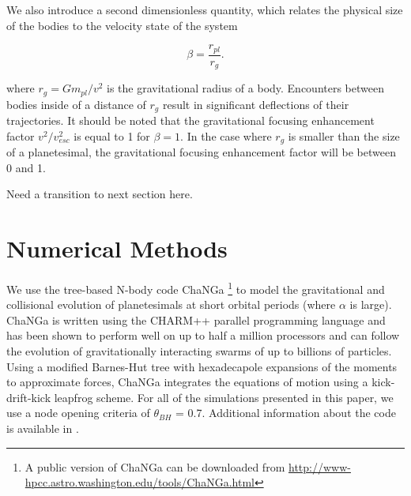 \documentclass[twocolumn]{aastex63}
\begin{document}
We also introduce a second dimensionless quantity, which relates the physical size of the bodies to the velocity state of the system

\begin{equation}\label{eq:beta}
	\beta = \frac{r_{pl}}{r_{g}}.
\end{equation}

\noindent where $r_{g} = G m_{pl} / v^{2}$ is the gravitational radius of a body. Encounters between bodies inside of a distance of $r_{g}$ result in significant deflections of their trajectories. It should be noted that the gravitational focusing enhancement factor $v^{2}/v_{esc}^{2}$ is equal to 1 for $\beta = 1$. In the case where $r_{g}$ is smaller than the size of a planetesimal, the gravitational focusing enhancement factor will be between 0 and 1. 

Need a transition to next section here.





\section{Numerical Methods}\label{sec:methods}

We use the tree-based N-body code {\sc ChaNGa} \footnote{A public version of {\sc ChaNGa} can be downloaded from \url{http://www-hpcc.astro.washington.edu/tools/ChaNGa.html}} to model the gravitational and collisional evolution of planetesimals at short orbital periods (where $\alpha$ is large). {\sc ChaNGa} is written using the {\sc CHARM++} parallel programming language and has been shown to perform well on up to half a million processors \citep{menon15} and can follow the evolution of gravitationally interacting swarms of up to billions of particles. Using a modified Barnes-Hut tree with hexadecapole expansions of the moments to approximate forces, {\sc ChaNGa} integrates the equations of motion using a kick-drift-kick leapfrog scheme. For all of the simulations presented in this paper, we use a node opening criteria of $\theta_{BH}$ = 0.7. Additional information about the code is available in \citep{jetley08}.
\end{document}
